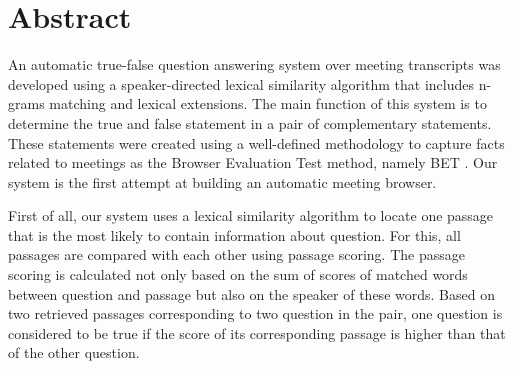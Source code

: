 


\newpage

\section*{Abstract}
\small
\onehalfspacing


An automatic true-false question answering system over meeting transcripts was developed using a speaker-directed lexical similarity algorithm that includes n-grams matching and lexical extensions. The main function of this system is to determine the true and false statement in a pair of complementary statements. These statements were created using a well-defined methodology to capture facts related to meetings as the Browser Evaluation Test method, namely BET \cite{BET}. Our system is the first attempt at building an automatic meeting browser. 

First of all, our system uses a lexical similarity algorithm to locate one passage that is the most likely to contain information about question. For this, all passages are compared with each other using passage scoring. The passage scoring is calculated not only based on the sum of scores of matched words between question and passage but also on the speaker of these words. Based on two retrieved passages corresponding to two question in the pair, one question is considered to be true if the score of its corresponding passage is higher than that of the other question.

